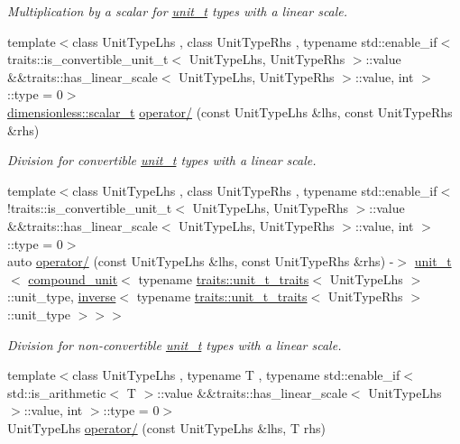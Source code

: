 \begin{DoxyCompactItemize}
\begin{DoxyCompactList}\small\item\em Multiplication by a scalar for \hyperlink{classunits_1_1unit__t}{unit\+\_\+t} types with a linear scale. \end{DoxyCompactList}\item 
{\footnotesize template$<$class Unit\+Type\+Lhs , class Unit\+Type\+Rhs , typename std\+::enable\+\_\+if$<$ traits\+::is\+\_\+convertible\+\_\+unit\+\_\+t$<$ Unit\+Type\+Lhs, Unit\+Type\+Rhs $>$\+::value \&\&traits\+::has\+\_\+linear\+\_\+scale$<$ Unit\+Type\+Lhs, Unit\+Type\+Rhs $>$\+::value, int $>$\+::type  = 0$>$ }\\\hyperlink{classunits_1_1unit__t}{dimensionless\+::scalar\+\_\+t} \hyperlink{namespaceunits_ab25fd921bcae7ad360270801b38ebeaa}{operator/} (const Unit\+Type\+Lhs \&lhs, const Unit\+Type\+Rhs \&rhs)
\begin{DoxyCompactList}\small\item\em Division for convertible \hyperlink{classunits_1_1unit__t}{unit\+\_\+t} types with a linear scale. \end{DoxyCompactList}\item 
{\footnotesize template$<$class Unit\+Type\+Lhs , class Unit\+Type\+Rhs , typename std\+::enable\+\_\+if$<$!traits\+::is\+\_\+convertible\+\_\+unit\+\_\+t$<$ Unit\+Type\+Lhs, Unit\+Type\+Rhs $>$\+::value \&\&traits\+::has\+\_\+linear\+\_\+scale$<$ Unit\+Type\+Lhs, Unit\+Type\+Rhs $>$\+::value, int $>$\+::type  = 0$>$ }\\auto \hyperlink{namespaceunits_ac32647919236d14893b4cf82d07a9357}{operator/} (const Unit\+Type\+Lhs \&lhs, const Unit\+Type\+Rhs \&rhs) -\/$>$ \hyperlink{classunits_1_1unit__t}{unit\+\_\+t}$<$ \hyperlink{group___unit_types_ga9c3f6f077dc894620e1ed8358442a8f1}{compound\+\_\+unit}$<$ typename \hyperlink{structunits_1_1traits_1_1unit__t__traits}{traits\+::unit\+\_\+t\+\_\+traits}$<$ Unit\+Type\+Lhs $>$\+::unit\+\_\+type, \hyperlink{group___unit_manipulators_gaacc539ef162e24b260d023d3ff949b57}{inverse}$<$ typename \hyperlink{structunits_1_1traits_1_1unit__t__traits}{traits\+::unit\+\_\+t\+\_\+traits}$<$ Unit\+Type\+Rhs $>$\+::unit\+\_\+type $>$$>$$>$
\begin{DoxyCompactList}\small\item\em Division for non-\/convertible \hyperlink{classunits_1_1unit__t}{unit\+\_\+t} types with a linear scale. \end{DoxyCompactList}\item 
\hypertarget{namespaceunits_a4b5aa610729119d0758f529ce5f24518}{}{\footnotesize template$<$class Unit\+Type\+Lhs , typename T , typename std\+::enable\+\_\+if$<$ std\+::is\+\_\+arithmetic$<$ T $>$\+::value \&\&traits\+::has\+\_\+linear\+\_\+scale$<$ Unit\+Type\+Lhs $>$\+::value, int $>$\+::type  = 0$>$ }\\Unit\+Type\+Lhs \hyperlink{namespaceunits_a4b5aa610729119d0758f529ce5f24518}{operator/} (const Unit\+Type\+Lhs \&lhs, T rhs)\label{namespaceunits_a4b5aa610729119d0758f529ce5f24518}


\end{DoxyCompactItemize}
